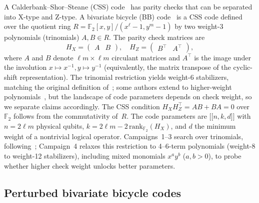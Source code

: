 \documentclass[aps,prxquantum,twocolumn,superscriptaddress,nofootinbib]{revtex4-2}
\newcommand{\FF}{\ensuremath{\mathbb{F}}}
\newcommand{\dblbrk}[1]{\ensuremath{\lbrack\!\lbrack #1 \rbrack\!\rbrack}}
\newcommand{\code}[1]{\dblbrk{#1}}
\begin{document}
A Calderbank--Shor--Steane (CSS) code~\cite{calderbank1996good,steane1996multiple} has parity checks that can be separated into X-type and Z-type. 
A bivariate bicycle (BB) code~\cite{bravyi2024high} is a CSS code defined over the quotient ring $R = \FF_2[x,y]/(x^\ell{-}1, y^m{-}1)$ by two weight-3 polynomials (trinomials) $A, B \in R$.
The parity check matrices are
\begin{equation}
H_X = \begin{pmatrix} A & B \end{pmatrix}, \quad
H_Z = \begin{pmatrix} B^\top & A^\top \end{pmatrix},
\end{equation}
where $A$ and $B$ denote $\ell m \times \ell m$ circulant matrices and $A^\top$ is the image under the involution $x \mapsto x^{-1}, y \mapsto y^{-1}$ (equivalently, the matrix transpose of the cyclic-shift representation).
The trinomial restriction yields weight-6 stabilizers, matching the original definition of~\cite{bravyi2024high}; some authors extend to higher-weight polynomials~\cite{panteleev2021degenerate,liang2025selfdual}, but the landscape of code parameters depends on check weight, so we separate claims accordingly.
The CSS condition $H_X H_Z^\top = AB + BA = 0$ over $\FF_2$ follows from the commutativity of~$R$.
The code parameters are $\code{n,k,d}$ with $n = 2\ell m$ physical qubits, $k = 2\ell m - 2\,\mathrm{rank}_{\FF_2}(H_X)$, and $d$ the minimum weight of a nontrivial logical operator.
Campaigns~1--3 search over trinomials, following~\cite{bravyi2024high}; Campaign~4 relaxes this restriction to 4--6-term polynomials (weight-8 to weight-12 stabilizers), including mixed monomials $x^a y^b$ ($a,b > 0$), to probe whether higher check weight unlocks better parameters.

\subsection{Perturbed bivariate bicycle codes}
\label{sec:pbb}
\end{document}
